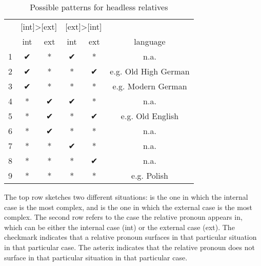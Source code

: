 \begin{table}[ht]
  \center
  \caption{Possible patterns for headless relatives}
    \begin{tabular}{ccc|ccc}
    \toprule
      &   \multicolumn{2}{c}{[\ac{int}]>[\ac{ext}]} & \multicolumn{2}{|c}{[\ac{ext}]>[\ac{int}]} &                  \\
          \cmidrule(lr){2-3}                      \cmidrule(lr){4-5}
      &   \ac{int}            & \ac{ext}          & \ac{int}          & \ac{ext}            & language              \\
          \cmidrule(lr){2-2}  \cmidrule(lr){3-3}  \cmidrule(lr){4-4}  \cmidrule(lr){5-5}    \cmidrule(lr){6-6}
    1 &   ✔                   & *                 & ✔               & *                     & n.a.                  \\
    2 &   ✔                   & *                 & *               & ✔                     & e.g. Old High German  \\
    3 &   ✔                   & *                 & *               & *                     & e.g. Modern German    \\
    4 &   {*}                 & ✔                 & ✔               & *                     & n.a.                  \\
    5 &   {*}                 & ✔                 & *               & ✔                     & e.g. Old English      \\
    6 &   {*}                 & ✔                 & *               & *                     & n.a.                  \\
    7 &   {*}                 & *                 & ✔               & *                     & n.a.                  \\
    8 &   {*}                 & *                 & *               & ✔                     & n.a.                  \\
    9 &   {*}                 & *                 & *               & *                     & e.g. Polish           \\
    \bottomrule
  \end{tabular}
    \label{tbl:possible-headless-relatives}
\end{table}

The top row sketches two different situations: \tit{[\ac{int}]>[\ac{ext}]} is the one in which the internal case is the most complex, and \tit{[\ac{ext}]>[\ac{int}]} is the one in which the external case is the most complex. The second row refers to the case the relative pronoun appears in, which can be either the internal case (\ac{int}) or the external case (\ac{ext}). The checkmark indicates that a relative pronoun surfaces in that particular situation in that particular case. The asterix indicates that the relative pronoun does not surface in that particular situation in that particular case.

